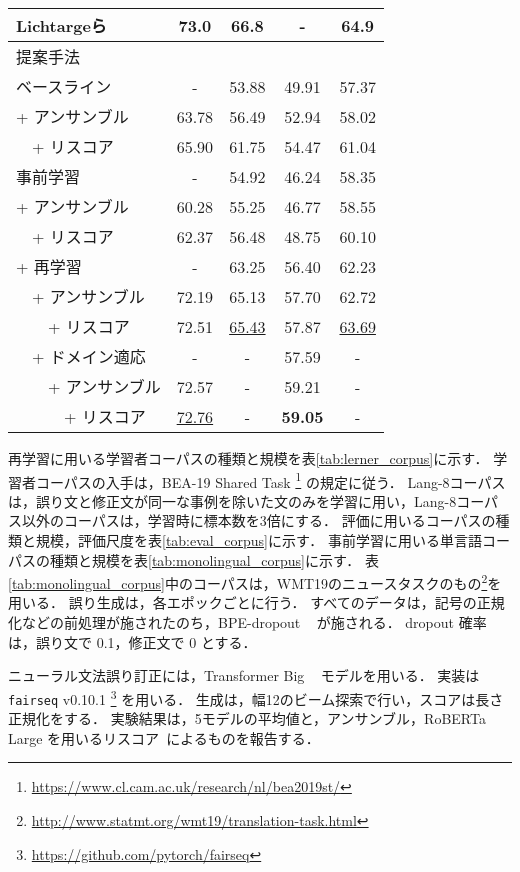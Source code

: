 \documentclass[
  platex, dvipdfmx %
]{nlp2021}
\begin{document}
\begin{table}[t]
\begin{tabular}{lcccc}
		Lichtargeら ~\cite{lichtarge-etal-2020-data}
		& 73.0 & \textbf{66.8} & - & \textbf{64.9} \\
		\hline
		\hline
		提案手法 \\
		ベースライン
		& - & 53.88 & 49.91 & 57.37 \\
		+ アンサンブル
		& 63.78 & 56.49 & 52.94 & 58.02 \\
		\ \ + リスコア
		& 65.90 & 61.75 & 54.47 & 61.04 \\
		\hline
		事前学習
		& - & 54.92 & 46.24 & 58.35 \\
		+ アンサンブル
		& 60.28 & 55.25 & 46.77 & 58.55 \\
		\ \ + リスコア
		& 62.37 & 56.48 & 48.75 & 60.10 \\
		\hline
		+ 再学習
		& - & 63.25 & 56.40 & 62.23 \\
		\ \ + アンサンブル
		& 72.19 & 65.13 & 57.70 & 62.72 \\
		\ \ \ \ + リスコア
		& 72.51 & \underline{65.43} & 57.87 & \underline{63.69} \\
		\hline
		\ \ + ドメイン適応
		& - & - & 57.59 & - \\
		\ \ \ \ + アンサンブル
		& 72.57 & - & 59.21 & - \\
		\ \ \ \ \ \ + リスコア
		& \underline{72.76} & - & \textbf{59.05} & - \\
		\hline
	\end{tabular}
\end{table}

再学習に用いる学習者コーパスの種類と規模を表\ref{tab:lerner_corpus}に示す．
学習者コーパスの入手は，BEA-19 Shared Task \footnote{\url{https://www.cl.cam.ac.uk/research/nl/bea2019st/}} の規定に従う．
Lang-8コーパスは，誤り文と修正文が同一な事例を除いた文のみを学習に用い，Lang-8コーパス以外のコーパスは，学習時に標本数を3倍にする．
評価に用いるコーパスの種類と規模，評価尺度を表\ref{tab:eval_corpus}に示す．
事前学習に用いる単言語コーパスの種類と規模を表\ref{tab:monolingual_corpus}に示す．
表\ref{tab:monolingual_corpus}中のコーパスは，WMT19のニュースタスクのもの\footnote{\url{http://www.statmt.org/wmt19/translation-task.html}}を用いる．
誤り生成は，各エポックごとに行う．
すべてのデータは，記号の正規化などの前処理が施されたのち，BPE-dropout ~\cite{provilkov-etal-2020-bpe} が施される．
dropout 確率は，誤り文で 0.1，修正文で 0 とする．

ニューラル文法誤り訂正には，Transformer Big ~\cite{NIPS2017_3f5ee243} モデルを用いる．
実装は \texttt{fairseq} v0.10.1 \footnote{\url{https://github.com/pytorch/fairseq}} を用いる．
生成は，幅12のビーム探索で行い，スコアは長さ正規化をする．
実験結果は，5モデルの平均値と，アンサンブル，RoBERTa Large を用いるリスコア~\cite{salazar-etal-2020-masked}によるものを報告する．
\end{document}
